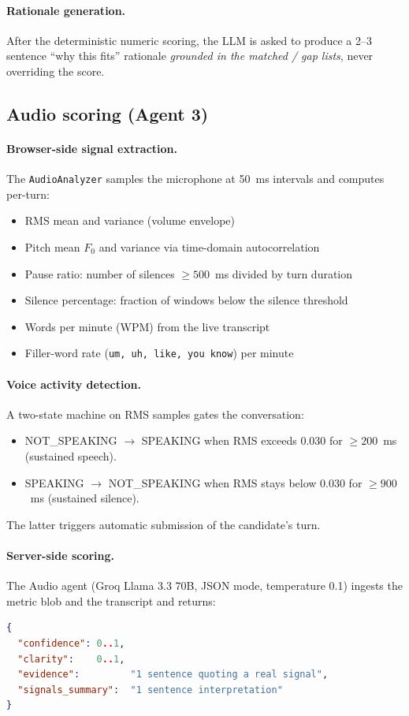 \documentclass[11pt,a4paper]{article}
\begin{document}
\paragraph{Rationale generation.} After the deterministic numeric scoring,
the LLM is asked to produce a 2--3 sentence ``why this fits'' rationale
\emph{grounded in the matched / gap lists}, never overriding the score.

\subsection{Audio scoring (Agent 3)}

\paragraph{Browser-side signal extraction.} The \texttt{AudioAnalyzer}
samples the microphone at 50~ms intervals and computes per-turn:

\begin{itemize}
  \item RMS mean and variance (volume envelope)
  \item Pitch mean $F_0$ and variance via time-domain autocorrelation
  \item Pause ratio: number of silences $\geq 500$~ms divided by turn duration
  \item Silence percentage: fraction of windows below the silence threshold
  \item Words per minute (WPM) from the live transcript
  \item Filler-word rate (\texttt{um, uh, like, you know}) per minute
\end{itemize}

\paragraph{Voice activity detection.} A two-state machine on RMS samples
gates the conversation:
\begin{itemize}
  \item NOT\_SPEAKING $\rightarrow$ SPEAKING when RMS exceeds $0.030$ for
        $\geq 200$~ms (sustained speech).
  \item SPEAKING $\rightarrow$ NOT\_SPEAKING when RMS stays below $0.030$
        for $\geq 900$~ms (sustained silence).
\end{itemize}
The latter triggers automatic submission of the candidate's turn.

\paragraph{Server-side scoring.} The Audio agent (Groq Llama 3.3 70B,
JSON mode, temperature 0.1) ingests the metric blob and the transcript
and returns:
\begin{lstlisting}[language=json]
{
  "confidence": 0..1,
  "clarity":    0..1,
  "evidence":         "1 sentence quoting a real signal",
  "signals_summary":  "1 sentence interpretation"
}
\end{lstlisting}
\end{document}
